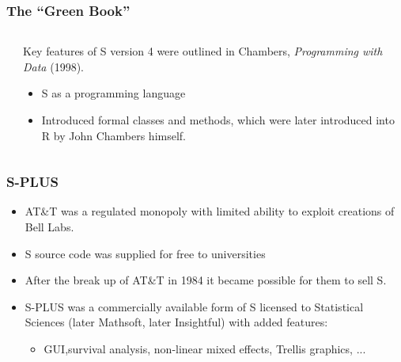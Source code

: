 \documentclass[svgnames]{beamer}
\begin{document}
\begin{frame}
  \frametitle{The ``Green Book''}

  \begin{columns}
    \begin{column}{2.5cm}
    \end{column}
    \begin{column}{7cm}
      Key features of S version 4 were outlined in Chambers, {\em Programming
      with Data} (1998).
      \begin{itemize}
      \item S as a programming language
      \item Introduced formal classes and methods, which were later
        introduced into R by John Chambers himself.
      \end{itemize}
    \end{column}
  \end{columns}

\end{frame}

\begin{frame}
  \frametitle{S-PLUS}

  \begin{itemize}
  \item AT\&T was a regulated monopoly with limited ability to exploit
    creations of Bell Labs.
  \item S source code was supplied for free to universities
  \item After the break up of AT\&T in 1984 it became possible for them
    to sell S.
  \item S-PLUS was a commercially available form of S licensed to
    Statistical Sciences (later Mathsoft, later Insightful) with added
    features:
    \begin{itemize}
    \item GUI,survival analysis, non-linear mixed effects, Trellis
      graphics, ...
    \end{itemize}
  \end{itemize}
  
\end{frame}
\end{document}

